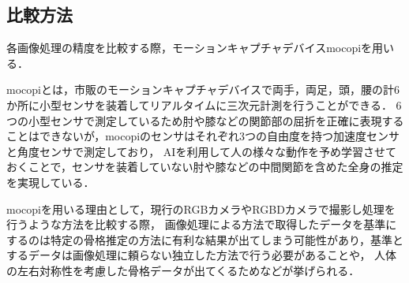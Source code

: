\documentclass[titlepage]{jarticle}
\begin{document}

%
%
%

%
%
\subsection{比較方法}
%
各画像処理の精度を比較する際，モーションキャプチャデバイスmocopi\cite{mocopi}を用いる．

mocopiとは，市販のモーションキャプチャデバイスで両手，両足，頭，腰の計6か所に小型センサを装着してリアルタイムに三次元計測を行うことができる．
6つの小型センサで測定しているため肘や膝などの関節部の屈折を正確に表現することはできないが，mocopiのセンサはそれぞれ3つの自由度を持つ加速度センサと角度センサで測定しており，
AIを利用して人の様々な動作を予め学習させておくことで，センサを装着していない肘や膝などの中間関節を含めた全身の推定を実現している．

mocopiを用いる理由として，現行のRGBカメラやRGBDカメラで撮影し処理を行うような方法を比較する際，
画像処理による方法で取得したデータを基準にするのは特定の骨格推定の方法に有利な結果が出てしまう可能性があり，基準とするデータは画像処理に頼らない独立した方法で行う必要があることや，
人体の左右対称性を考慮した骨格データが出てくるためなどが挙げられる．
\end{document}
